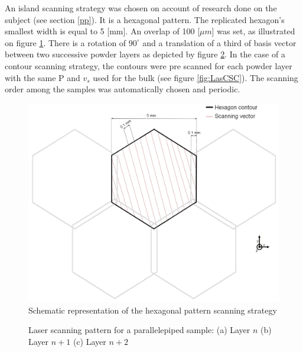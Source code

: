 An island scanning strategy was chosen on account of research done on the subject (see section \ref{pp}). It is a hexagonal pattern. The replicated hexagon's smallest width is equal to 5 [mm]. An overlap of 100 [$\mu m$] was set, as illustrated on figure \ref{fig:OL}. There is a rotation of $90^\circ$ and a translation of a third of basis vector between two successive powder layers as depicted by figure \ref{fig:Lassup}. In the case of a contour scanning strategy, the contours were pre scanned for each powder layer with the same P and $v_s$ used for the bulk (see figure \ref{fig:LasCSC}). The scanning order among the samples was automatically chosen and periodic. \\

\begin{figure}[ht]
\centering
\includegraphics[scale=0.27]{Images/OL}
\decoRule
\caption[Schematic representation of the hexagonal pattern scanning strategy]{Schematic representation of the hexagonal pattern scanning strategy}
\label{fig:OL}
\end{figure}

\begin{figure}[ht]
\centering
\noindent{}
\decoRule
\caption[Screen capture of the laser scanning pattern for a parallelepiped sample: (a) Layer $n$ (b) Layer $n+1$ (c) Layer $n+2$]{Laser scanning pattern for a parallelepiped sample: (a) Layer $n$ (b) Layer $n+1$ (c) Layer $n+2$}
\label{fig:Lassup}
\end{figure}

